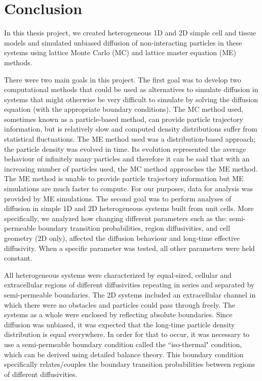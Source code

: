 \chapter{Conclusion}
	
	In this thesis project, we created heterogeneous 1D and 2D simple cell and tissue models and simulated unbiased diffusion of non-interacting particles in these systems using lattice Monte Carlo (MC) and lattice master equation (ME) methods. 
	
	There were two main goals in this project. The first goal was to develop two computational methods that could be used as alternatives to simulate diffusion in systems that might otherwise be very difficult to simulate by solving the diffusion equation (with the appropriate boundary conditions). The MC method used, sometimes known as a particle-based method, can provide particle trajectory information, but is relatively slow and computed density distributions suffer from statistical fluctuations. The ME method used was a distribution-based approach; the particle density was evolved in time. Its evolution represented the average behaviour of infinitely many particles and therefore it can be said that with an increasing number of particles used, the MC method approaches the ME method. The ME method is unable to provide particle trajectory information but ME simulations are much faster to compute. For our purposes, data for analysis was provided by ME simulations. The second goal was to perform analyses of diffusion in simple 1D and 2D heterogeneous systems built from unit cells. More specifically, we analyzed how changing different parameters such as the: semi-permeable boundary transition probabilities, region diffusivities, and cell geometry (2D only), affected the diffusion behaviour and long-time effective diffusivity. When a specific parameter was tested, all other parameters were held constant.
	
	\newpage
	
	All heterogeneous systems were characterized by equal-sized, cellular and extracellular regions of different diffusivities repeating in series and separated by semi-permeable boundaries. The 2D systems included an extracellular channel in which there were no obstacles and particles could pass through freely. The systems as a whole were enclosed by reflecting absolute boundaries. Since diffusion was unbiased, it was expected that the long-time particle density distribution is equal everywhere. In order for that to occur, it was necessary to use a semi-permeable boundary condition called the ``iso-thermal" condition, which can be derived using detailed balance theory. This boundary condition specifically relates/couples the boundary transition probabilities between regions of different diffusivities.
	
